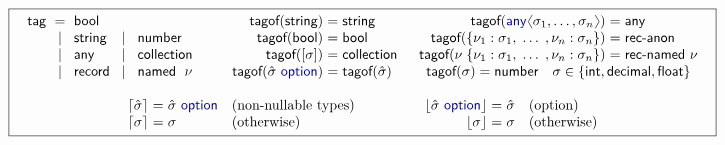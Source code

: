 \documentclass[10pt,preprint,clearpagebib]{sigplanconf}
\newcommand{\langl}{\begin{picture}(4.5,7)
\put(1.1,2.5){\rotatebox{60}{\line(1,0){5.5}}}
\put(1.1,2.5){\rotatebox{300}{\line(1,0){5.5}}}
\end{picture}}
\newcommand{\rangl}{\begin{picture}(4.5,7)
\put(.9,2.5){\rotatebox{120}{\line(1,0){5.5}}}
\put(.9,2.5){\rotatebox{240}{\line(1,0){5.5}}}
\end{picture}}
\newcommand{\kvd}[1]{\textnormal{\textcolor{kvdclr}{\sffamily #1}}}
\newcommand{\ident}[1]{\textnormal{\sffamily #1}}
\newcommand{\lsep}[0]{\;\; | \;\;}
\newcommand{\narrow}[1]{\hspace{-0.7em} #1 \hspace{-0.7em}}
\newcommand{\tytag}{\ident{tag}}
\newcommand{\dropopt}[1]{\lfloor#1\rfloor}
\newcommand{\addopt}[1]{\lceil#1\rceil}
\newcommand{\tytagof}{\ident{tagof}}
\begin{document}
\begin{figure}[t]
\noindent
\begin{equation*}
\boxed{
\begin{array}{c}
\begin{array}{rclcl}
 \tytag &\narrow{=}& \ident{bool} \\
        &\narrow{\lsep}& \ident{string} &\narrow{\lsep}& \ident{number}  \\
        &\narrow{\lsep}& \ident{any}  &\narrow{\lsep}& \ident{collection} \\
        &\narrow{\lsep}& \ident{record} &\narrow{\lsep}& \ident{named}\;~\nu 
\end{array}
%
\quad\;\;\;
%
\begin{array}{rcl}
 \tytagof(\ident{string}) &\narrow{=}& \ident{string}\\
 \tytagof(\ident{bool}) &\narrow{=}& \ident{bool}\\
 \tytagof([\sigma]) &\narrow{=}& \ident{collection}\\
 \tytagof(\hat{\sigma}~\kvd{option}) &\narrow{=}& \tytagof(\hat{\sigma})
\end{array}
%
\;\;
%
\begin{array}{rcl}
 \tytagof(\kvd{any}\langl\sigma_1, \ldots, \sigma_n\rangl) &\narrow{=}& \ident{any}\\
 \tytagof(\{ \nu_1 : \sigma_1, \; \ldots \; , \nu_n : \sigma_n \}) &\narrow{=}& \ident{rec-anon}\\
 \tytagof(\nu\; \{ \nu_1 : \sigma_1, \; \ldots \; , \nu_n : \sigma_n \}) &\narrow{=}& \ident{rec-named}~\nu \\
 \multicolumn{3}{c}{ \tytagof(\sigma) = \ident{number}\quad \sigma \in\{ \ident{int},\ident{decimal},\ident{float} \}  } 
\end{array}
%
\\[3em]
%
\begin{array}{rcll}
 \addopt{\hat{\sigma}} &\narrow{=}& \hat{\sigma}~\kvd{option} &(\textnormal{non-nullable types})\\
 \addopt{\sigma} &\narrow{=}& \sigma &(\textnormal{otherwise})
\end{array}
\qquad\qquad
\begin{array}{rcll}
 \dropopt{\hat{\sigma}~\kvd{option}} &\narrow{=}& \hat{\sigma} &(\textnormal{option})\\
 \dropopt{\sigma} &\narrow{=}& \sigma &(\textnormal{otherwise})
\end{array}
\end{array}
}
\end{equation*}


\end{figure}
\end{document}
